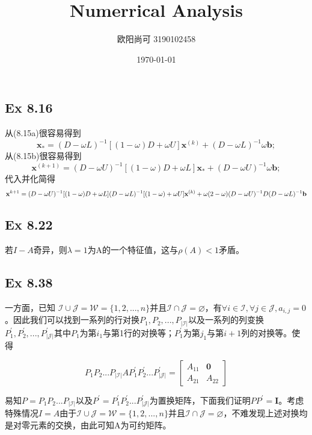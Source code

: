 \documentclass{article}
\title{Numerrical Analysis}
\author{欧阳尚可  3190102458}
\date{\today}
\begin{document}
\maketitle

\newpage

\subsection*{Ex 8.16}
\indent 从(8.15a)很容易得到
$$
\textbf{x}_{*}=(D-\omega L)^{-1}[(1-\omega)D+\omega U]\textbf{x}^{(k)}+(D-\omega L)^{-1}\omega \textbf{b};
$$
从(8.15b)很容易得到
$$
\textbf{x}^{(k+1)}=(D-\omega U)^{-1}[(1-\omega)D+\omega L]\textbf{x}_{*}+(D-\omega U)^{-1}\omega \textbf{b};
$$
代入并化简得
$$
\textbf{x}^{k+1}=(D-\omega U)^{-1}[(1-\omega)D+\omega L](D-\omega L)^{-1}[(1-\omega)+\omega U]\textbf{x}^{(k)} \\
+\omega(2-\omega)(D-\omega U)^{-1}D(D-\omega L)^{-1}\textbf{b}
$$

\subsection*{Ex 8.22}
\indent 若$I-A$奇异，则$\lambda = 1$为A的一个特征值，这与$\rho(A)<1$矛盾。

\subsection*{Ex 8.38}
\indent 一方面，已知	$\mathscr{I}\cup\mathscr{J}=\mathscr{W}=\{1,2,...,n\}$并且$\mathscr{I}\cap\mathscr{J}=\varnothing$，有$\forall i \in \mathscr{I},\forall j \in \mathscr{J},a_{i,j}=0$。因此我们可以找到一系列的行对换$P_{1},P_{2},...,P_{\vert \mathscr{I}\vert}$以及一系列的列变换$P^{'}_{1},P^{'}_{2},...,P^{'}_{\vert \mathscr{J}\vert}$其中$P_{1}$为第$i_{1}$与第1行的对换等；$P^{'}_{1}$为第$j_{1}$与第$i+1$列的对换等。使得

\begin{equation*}
P_{1}P_{2}...P_{\vert \mathscr{I}\vert}AP^{'}_{1}P^{'}_{2}...P^{'}_{\vert \mathscr{J}\vert}={
\left [ \begin{array}{cc}
A_{11} & \textbf{0} \\
A_{21} & A_{22}
\end{array}\right ]}
\end{equation*}

易知$P=P_{1}P_{2}...P_{\vert \mathscr{I}\vert}$以及$P^{'}=P^{'}_{1}P^{'}_{2}...P^{'}_{\vert \mathscr{J}\vert}$为置换矩阵，下面我们证明$PP^{'}=\textbf{I}$。考虑特殊情况$I=A$由于$\mathscr{I}\cup\mathscr{J}=\mathscr{W}=\{1,2,...,n\}$并且$\mathscr{I}\cap\mathscr{J}=\varnothing$，不难发现上述对换均是对零元素的交换，由此可知A为可约矩阵。
\end{document}
